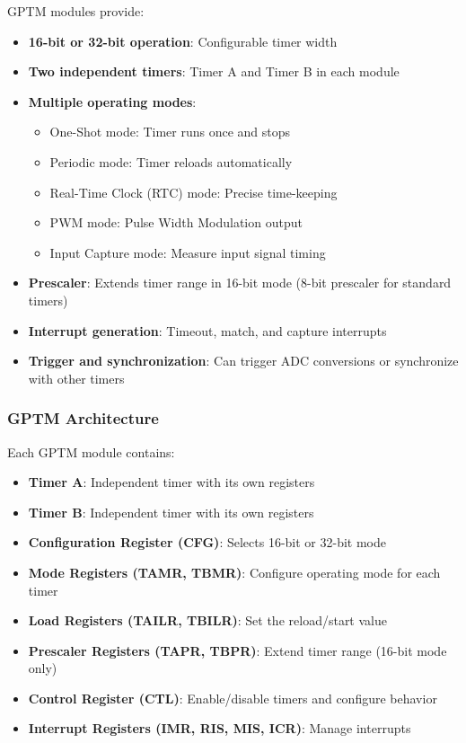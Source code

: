 GPTM modules provide:
\begin{itemize}[nosep]
  \item \textbf{16-bit or 32-bit operation}: Configurable timer width
  \item \textbf{Two independent timers}: Timer A and Timer B in each module
  \item \textbf{Multiple operating modes}:
    \begin{itemize}[nosep]
      \item One-Shot mode: Timer runs once and stops
      \item Periodic mode: Timer reloads automatically
      \item Real-Time Clock (RTC) mode: Precise time-keeping
      \item PWM mode: Pulse Width Modulation output
      \item Input Capture mode: Measure input signal timing
    \end{itemize}
  \item \textbf{Prescaler}: Extends timer range in 16-bit mode (8-bit prescaler for standard timers)
  \item \textbf{Interrupt generation}: Timeout, match, and capture interrupts
  \item \textbf{Trigger and synchronization}: Can trigger ADC conversions or synchronize with other timers
\end{itemize}

\subsubsection{GPTM Architecture}

Each GPTM module contains:
\begin{itemize}[nosep]
  \item \textbf{Timer A}: Independent timer with its own registers
  \item \textbf{Timer B}: Independent timer with its own registers
  \item \textbf{Configuration Register (CFG)}: Selects 16-bit or 32-bit mode
  \item \textbf{Mode Registers (TAMR, TBMR)}: Configure operating mode for each timer
  \item \textbf{Load Registers (TAILR, TBILR)}: Set the reload/start value
  \item \textbf{Prescaler Registers (TAPR, TBPR)}: Extend timer range (16-bit mode only)
  \item \textbf{Control Register (CTL)}: Enable/disable timers and configure behavior
  \item \textbf{Interrupt Registers (IMR, RIS, MIS, ICR)}: Manage interrupts
\end{itemize}

